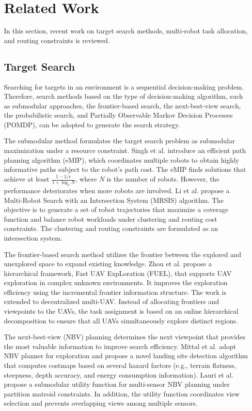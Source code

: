 \chapter{Related Work}
In this section, recent work on target search methods, multi-robot task allocation, and routing constraints is reviewed.

\section{Target Search}
Searching for targets in an environment is a sequential decision-making problem. Therefore, search methods based on the type of decision-making algorithm, such as submodular approaches, the frontier-based search, the next-best-view search, the probabilistic search, and Partially Observable Markov Decision Processes (POMDP), can be adopted to generate the search strategy.

The submodular method formulates the target search problem as submodular maximization under a resource constraint.
Singh et al. \cite{singh2007efficient} introduce an efficient path planning algorithm (eMIP), which coordinates multiple robots to obtain highly informative paths subject to the robot's path cost.
The eMIP finds solutions that achieve at least $\frac{1-1/e}{1+\log_2 N}$, where $N$ is the number of robots.
However, the performance deteriorates when more robots are involved.
Li et al. \cite{li2024mrsis} propose a Multi-Robot Search with an Intersection System (MRSIS) algorithm.
The objective is to generate a set of robot trajectories that maximize a coverage function and balance robot workloads under clustering and routing cost constraints.
The clustering and routing constraints are formulated as an intersection system.

The frontier-based search method utilizes the frontier between the explored and unexplored space to expand existing knowledge.
Zhou et al. \cite{zhou2021fuel} propose a hierarchical framework, Fast UAV ExpLoration (FUEL), that supports UAV exploration in complex unknown environments. It improves the exploration efficiency using the incremental frontier information structure.
The work is extended to decentralized multi-UAV\cite{zhou2023racer}.
Instead of allocating frontiers and viewpoints to the UAVs, the task assignment is based on an online hierarchical decomposition to ensure that all UAVs simultaneously explore distinct regions.

The next-best-view (NBV) planning determines the next viewpoint that provides the most valuable information to improve search efficiency.
Mittal et al. \cite{mittal2019vision} adopt NBV planner for exploration and propose a novel landing site detection algorithm that computes costmaps based on several hazard factors (e.g., terrain flatness, steepness, depth accuracy, and energy consumption information).
Lauri et al. \cite{lauri2020multi} propose a submodular utility function for multi-sensor NBV planning under partition matroid constraints. In addition, the utility function coordinates view selection and prevents overlapping views among multiple sensors.

